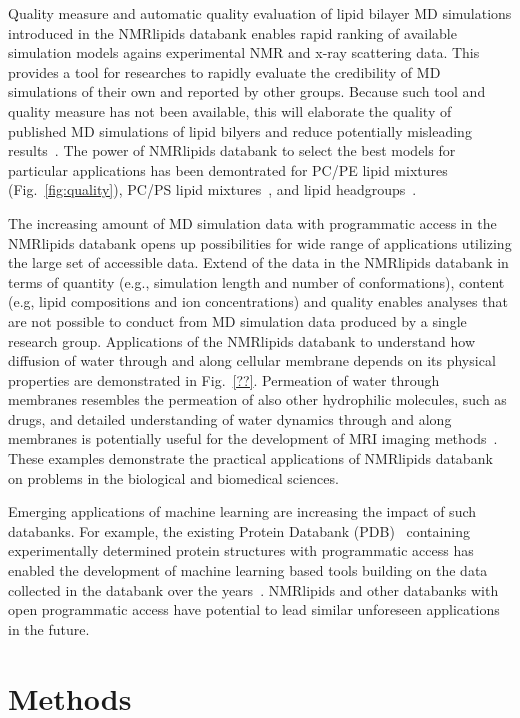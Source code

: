 \documentclass[fleqn,10pt]{wlscirep}
\begin{document}
Quality measure and automatic quality evaluation of lipid bilayer MD simulations introduced in the NMRlipids databank enables rapid ranking of available simulation models agains experimental NMR and x-ray scattering data. This provides a tool for researches to rapidly evaluate the credibility of MD simulations of their own and reported by other groups. Because such tool and quality measure has not been available, this will elaborate the quality of published MD simulations of lipid bilyers and reduce potentially misleading results~\cite{antila22b}. The power of NMRlipids databank to select the best models for particular applications has been demontrated for PC/PE lipid mixtures (Fig.~\ref{fig:quality}), PC/PS lipid mixtures~\cite{antila22b}, and lipid headgroups~\cite{bacle21}.

The increasing amount of MD simulation data with programmatic access in the NMRlipids databank opens up possibilities for wide range of applications utilizing the large set of accessible data. Extend of the data in the NMRlipids databank in terms of quantity (e.g., simulation length and number of conformations), content (e.g, lipid compositions and ion concentrations) and quality enables analyses that are not possible to conduct from MD simulation data produced by a single research group. Applications of the NMRlipids databank to understand how diffusion of water through and along cellular membrane depends on its physical properties are demonstrated in Fig.~\ref{??}. Permeation of water through membranes resembles the permeation of also other hydrophilic molecules, such as drugs, and detailed understanding of water dynamics through and along membranes is potentially useful for the development of MRI imaging methods~\cite{topgaard20}. 
These examples demonstrate the practical applications of NMRlipids databank on problems in the biological and biomedical sciences.


Emerging applications of machine learning are increasing the impact of such databanks. For example, the existing Protein Databank (PDB)~\cite{??} containing experimentally determined protein structures with programmatic access has enabled the development of machine learning based tools building on the data collected in the databank over the years~\cite{??}. NMRlipids and other databanks with open programmatic access have potential to lead similar unforeseen applications in the future.


\section{Methods}
\end{document}
